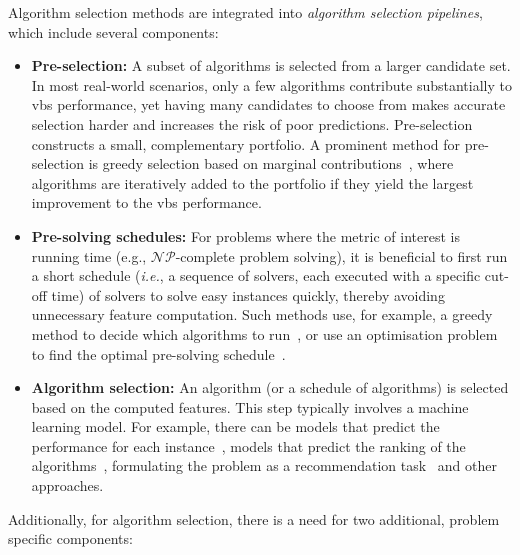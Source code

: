 Algorithm selection methods are integrated into \textit{algorithm selection pipelines}, which include several components:
\begin{itemize}
    \item \textbf{Pre-selection:} A subset of algorithms is selected from a larger candidate set. In most real-world scenarios, only a few algorithms contribute substantially to \gls{vbs} performance, yet having many candidates to choose from makes accurate selection harder and increases the risk of poor predictions. Pre-selection constructs a small, complementary portfolio. A prominent method for pre-selection is greedy selection based on marginal contributions~\citep{XuEtAl08}, where algorithms are iteratively added to the portfolio if they yield the largest improvement to the \gls{vbs} performance.

    \item \textbf{Pre-solving schedules:} For problems where the metric of interest is running time (e.g., $\mathcal{NP}$-complete problem solving), it is beneficial to first run a short schedule (\emph{i.e.}, a sequence of solvers, each executed with a specific cut-off time) of solvers to solve easy instances quickly, thereby avoiding unnecessary feature computation. Such methods use, for example, a greedy method to decide which algorithms to run~\citep{XuEtAl08}, or use an optimisation problem to find the optimal pre-solving schedule~\citep{HooEtAl12,KadEtAl11}.

    \item \textbf{Algorithm selection:} An algorithm (or a schedule of algorithms) is selected based on the computed features. This step typically involves a machine learning model. For example, there can be models that predict the performance for each instance~\citep{XuEtAl08,OztEtAl22}, models that predict the ranking of the algorithms~\citep{XuEtAl12,KerEtAl18}, formulating the problem as a recommendation task~\citep{MisSeb17} and other approaches.

\end{itemize}
Additionally, for algorithm selection, there is a need for two additional, problem specific components:
